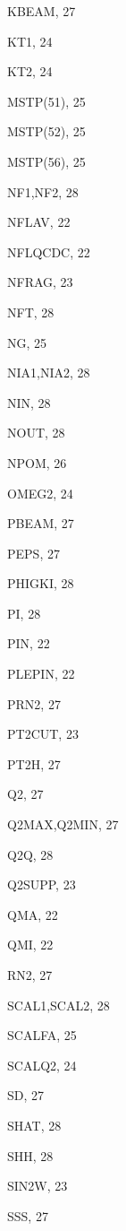 \documentclass[10pt]{article} \usepackage{dina4}
\begin{document}
\begin{theindex}
  \item KBEAM, 27
  \item KT1, 24
  \item KT2, 24

  \indexspace

  \item MSTP(51), 25
  \item MSTP(52), 25
  \item MSTP(56), 25

  \indexspace

  \item NF1,NF2, 28
  \item NFLAV, 22
  \item NFLQCDC, 22
  \item NFRAG, 23
  \item NFT, 28
  \item NG, 25
  \item NIA1,NIA2, 28
  \item NIN, 28
  \item NOUT, 28
  \item NPOM, 26

  \indexspace

  \item OMEG2, 24

  \indexspace

  \item PBEAM, 27
  \item PEPS, 27
  \item PHIGKI, 28
  \item PI, 28
  \item PIN, 22
  \item PLEPIN, 22
  \item PRN2, 27
  \item PT2CUT, 23
  \item PT2H, 27

  \indexspace

  \item Q2, 27
  \item Q2MAX,Q2MIN, 27
  \item Q2Q, 28
  \item Q2SUPP, 23
  \item QMA, 22
  \item QMI, 22

  \indexspace

  \item RN2, 27

  \indexspace

  \item SCAL1,SCAL2, 28
  \item SCALFA, 25
  \item SCALQ2, 24
  \item SD, 27
  \item SHAT, 28
  \item SHH, 28
  \item SIN2W, 23
  \item SSS, 27


\end{theindex}
\end{document}
